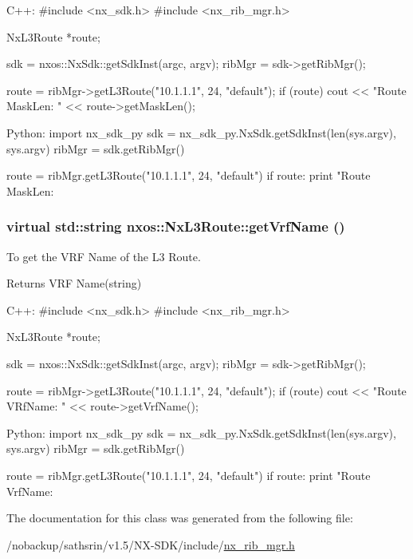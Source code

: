 \begin{DoxyCode}
  C++:
       #include <nx_sdk.h>
       #include <nx_rib_mgr.h>

       NxL3Route    *route;

       sdk = nxos::NxSdk::getSdkInst(argc, argv);
       ribMgr = sdk->getRibMgr();

       route = ribMgr->getL3Route("10.1.1.1", 24, "default");
       if (route) {
           cout << "Route MaskLen: " << route->getMaskLen();
       }

  Python:
       import nx_sdk_py
       sdk = nx_sdk_py.NxSdk.getSdkInst(len(sys.argv), sys.argv)
       ribMgr = sdk.getRibMgr()

       route = ribMgr.getL3Route("10.1.1.1", 24, "default")
       if route:
          print "Route MaskLen: %
\end{DoxyCode}
 \hypertarget{classnxos_1_1NxL3Route_a06ed660337e8b919dd801267957497d7}{
\subsubsection[{getVrfName}]{\setlength{\rightskip}{0pt plus 5cm}virtual std::string nxos::NxL3Route::getVrfName ()}}
\label{classnxos_1_1NxL3Route_a06ed660337e8b919dd801267957497d7}
To get the VRF Name of the L3 Route.

\begin{DoxyReturn}{Returns}
VRF Name(string)
\end{DoxyReturn}

\begin{DoxyCode}
  C++:
       #include <nx_sdk.h>
       #include <nx_rib_mgr.h>

       NxL3Route    *route;

       sdk = nxos::NxSdk::getSdkInst(argc, argv);
       ribMgr = sdk->getRibMgr();

       route = ribMgr->getL3Route("10.1.1.1", 24, "default");
       if (route) {
           cout << "Route VRfName: " << route->getVrfName();
       }

  Python:
       import nx_sdk_py
       sdk = nx_sdk_py.NxSdk.getSdkInst(len(sys.argv), sys.argv)
       ribMgr = sdk.getRibMgr()

       route = ribMgr.getL3Route("10.1.1.1", 24, "default")
       if route:
          print "Route VrfName: %
\end{DoxyCode}
 

The documentation for this class was generated from the following file:\begin{DoxyCompactItemize}
\item 
/nobackup/sathsrin/v1.5/NX-\/SDK/include/\hyperlink{nx__rib__mgr_8h}{nx\_\-rib\_\-mgr.h}\end{DoxyCompactItemize}
